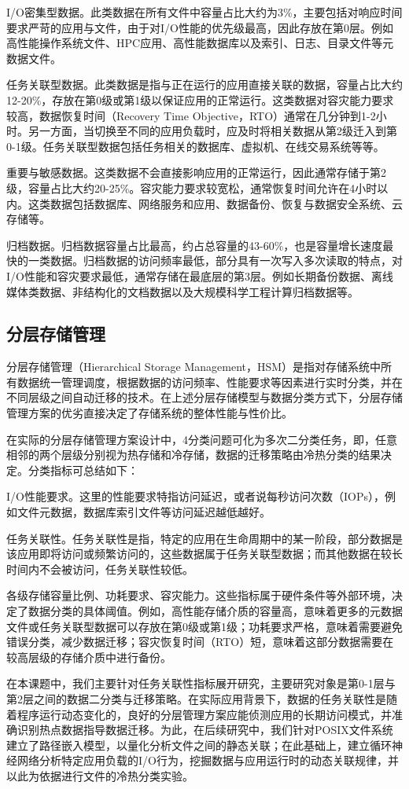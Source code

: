 I/O密集型数据。此类数据在所有文件中容量占比大约为3\%，主要包括对响应时间要求严苛的应用与文件，由于对I/O性能的优先级最高，因此存放在第0层。例如高性能操作系统文件、HPC应用、高性能数据库以及索引、日志、目录文件等元数据文件。

任务关联型数据。此类数据是指与正在运行的应用直接关联的数据，容量占比大约12-20\%，存放在第0级或第1级以保证应用的正常运行。这类数据对容灾能力要求较高，数据恢复时间（Recovery Time Objective，RTO）通常在几分钟到1-2小时。另一方面，当切换至不同的应用负载时，应及时将相关数据从第2级迁入到第0-1级。任务关联型数据包括任务相关的数据库、虚拟机、在线交易系统等等。


重要与敏感数据。这类数据不会直接影响应用的正常运行，因此通常存储于第2级，容量占比大约20-25\%。容灾能力要求较宽松，通常恢复时间允许在4小时以内。这类数据包括数据库、网络服务和应用、数据备份、恢复与数据安全系统、云存储等。

归档数据。归档数据容量占比最高，约占总容量的43-60\%，也是容量增长速度最快的一类数据。归档数据的访问频率最低，部分具有一次写入多次读取的特点，对I/O性能和容灾要求最低，通常存储在最底层的第3层。例如长期备份数据、离线媒体类数据、非结构化的文档数据以及大规模科学工程计算归档数据等。

\subsection{分层存储管理}
分层存储管理（Hierarchical Storage Management，HSM）是指对存储系统中所有数据统一管理调度，根据数据的访问频率、性能要求等因素进行实时分类，并在不同层级之间自动迁移的技术。在上述分层存储模型与数据分类方式下，分层存储管理方案的优劣直接决定了存储系统的整体性能与性价比。

在实际的分层存储管理方案设计中，4分类问题可化为多次二分类任务，即，任意相邻的两个层级分别视为热存储和冷存储，数据的迁移策略由冷热分类的结果决定。分类指标可总结如下：

I/O性能要求。这里的性能要求特指访问延迟，或者说每秒访问次数（IOPs），例如文件元数据，数据库索引文件等访问延迟越低越好。

任务关联性。任务关联性是指，特定的应用在生命周期中的某一阶段，部分数据是该应用即将访问或频繁访问的，这些数据属于任务关联型数据；而其他数据在较长时间内不会被访问，任务关联性较低。

各级存储容量比例、功耗要求、容灾能力。这些指标属于硬件条件等外部环境，决定了数据分类的具体阈值。例如，高性能存储介质的容量高，意味着更多的元数据文件或任务关联型数据可以存放在第0级或第1级；功耗要求严格，意味着需要避免错误分类，减少数据迁移；容灾恢复时间（RTO）短，意味着这部分数据需要在较高层级的存储介质中进行备份。

在本课题中，我们主要针对任务关联性指标展开研究，主要研究对象是第0-1层与第2层之间的数据二分类与迁移策略。在实际应用背景下，数据的任务关联性是随着程序运行动态变化的，良好的分层管理方案应能侦测应用的长期访问模式，并准确识别热点数据指导数据迁移。为此，在后续研究中，我们针对POSIX文件系统建立了路径嵌入模型，以量化分析文件之间的静态关联；在此基础上，建立循环神经网络分析特定应用负载的I/O行为，挖掘数据与应用运行时的动态关联规律，并以此为依据进行文件的冷热分类实验。

